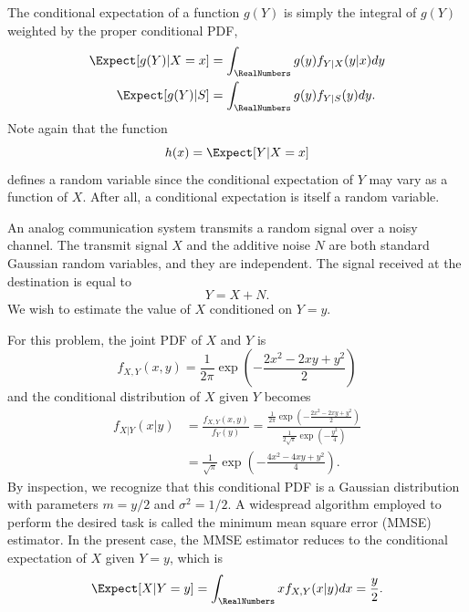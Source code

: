 The conditional expectation of a function $g(Y)$ is simply the integral of $g(Y)$ weighted by the proper conditional PDF,
\begin{align*}
\Expect [g(Y) | X = x] &= \int_{\RealNumbers} g(y) f_{Y|X} (y|x) dy \\
\Expect [g(Y) | S] &= \int_{\RealNumbers} g(y) f_{Y|S} (y) dy .
\end{align*}
Note again that the function
\begin{equation*}
h(x) = \Expect [Y | X=x]
\end{equation*}
defines a random variable since the conditional expectation of $Y$ may vary as a function of $X$.
After all, a conditional expectation is itself a random variable.

\begin{example}
An analog communication system transmits a random signal over a noisy channel.
The transmit signal $X$ and the additive noise $N$ are both standard Gaussian random variables, and they are independent.
The signal received at the destination is equal to
\begin{equation*}
Y = X + N .
\end{equation*}
We wish to estimate the value of $X$ conditioned on $Y = y$.

For this problem, the joint PDF of $X$ and $Y$ is
\begin{equation*}
f_{X,Y} (x,y) = \frac{1}{2 \pi}
\exp \left( - \frac{2 x^2 - 2 xy + y^2}{2}  \right)
\end{equation*}
and the conditional distribution of $X$ given $Y$ becomes
\begin{equation*}
\begin{split}
f_{X|Y} (x|y) &= \frac{f_{X,Y} (x,y)}{f_{Y} (y)}
= \frac{ \frac{1}{2 \pi} \exp \left( - \frac{2 x^2 - 2 xy + y^2}{2}  \right) }
{ \frac{1}{2 \sqrt{\pi}} \exp \left( - \frac{y^2}{4}  \right) } \\
&=\frac{1}{\sqrt{\pi}}
\exp \left( - \frac{4 x^2 - 4 xy + y^2}{4}  \right) .
\end{split}
\end{equation*}
By inspection, we recognize that this conditional PDF is a Gaussian distribution with parameters $m = y/2$ and $\sigma^2 = 1/2$.
A widespread algorithm employed to perform the desired task is called the minimum mean square error (MMSE) estimator.
In the present case, the MMSE estimator reduces to the conditional expectation of $X$ given $Y = y$, which is
\begin{equation*}
\Expect [X | Y = y] = \int_{\RealNumbers} x f_{X,Y}(x|y) dx
= \frac{y}{2} .
\end{equation*}
\end{example}


